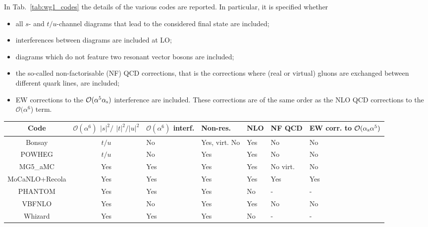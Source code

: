 In Tab.~\ref{tab:wg1_codes} the details of the various codes are reported. In particular, it is specified whether
\begin{itemize}
    \item all $s$- and $t/u$-channel diagrams that lead to the considered final state are included;
    \item interferences between diagrams are included at LO;
    \item diagrams which do not feature two resonant vector bosons are included;
    \item the so-called non-factorisable (NF) QCD corrections, that is the corrections where (real or virtual) gluons are exchanged between different quark lines,
        are included;
    \item EW corrections to the $\mathcal O (\alpha^5\alpha_\text{s})$ interference are included. These corrections are of the same order as the NLO QCD corrections to
        the  $\mathcal O (\alpha^6$) term.
\end{itemize}

\begin{table*}[ht!]
    \footnotesize
    \begin{tabularx}{\textwidth}{c|c|X|X|X|X|X}
        Code  &  $\mathcal O(\alpha^6)$ $|s|^2/$ $|t|^2/|u|^2$  &  $\mathcal O(\alpha^6)$ interf.  &  Non-res.  & NLO &  NF QCD  &  EW corr. to $\mathcal O(\alpha_\text{s} \alpha^5)$  \\
        \hline
        \hline
        {\sc Bonsay}        &  $t/u$    &  No       &  Yes, virt. No    &  Yes   & No       &  No  \\
        {\sc POWHEG}        &  $t/u$    &  No       &  Yes              &  Yes   & No       &  No  \\
        {\sc MG5\_aMC}      &  Yes      &  Yes      &  Yes              &  Yes   & No virt. &  No \\
        {\sc MoCaNLO+Recola}&  Yes      &  Yes      &  Yes              &  Yes   & Yes      &  Yes  \\
        {\sc PHANTOM}       &  Yes      &  Yes      &  Yes              &  No    & -        & - \\
        {\sc VBFNLO}        &  Yes      &  No       &  Yes              &  Yes   & No       &  No  \\
        {\sc Whizard}       &  Yes      &  Yes      &  Yes              &  No    & -        & - \\
    \end{tabularx}
    \caption{\label{tab:wg1_codes} Summary of the different properties of the codes employed in the comparison.}
\end{table*}
